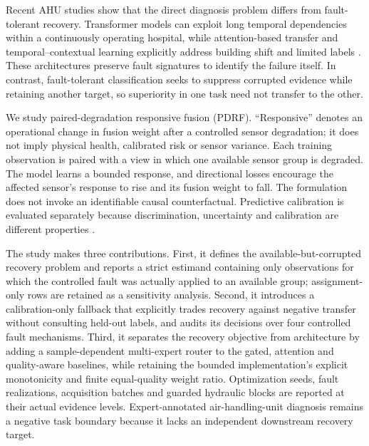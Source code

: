 \documentclass[11pt]{article}
\begin{document}
Recent AHU studies show that the direct diagnosis problem differs from fault-tolerant recovery. Transformer models can exploit long temporal dependencies within a continuously operating hospital, while attention-based transfer and temporal--contextual learning explicitly address building shift and limited labels \citep{wang2025ahutransformer,feng2024attention,wang2026temporal}. These architectures preserve fault signatures to identify the failure itself. In contrast, fault-tolerant classification seeks to suppress corrupted evidence while retaining another target, so superiority in one task need not transfer to the other.

We study paired-degradation responsive fusion (PDRF). ``Responsive'' denotes an operational change in fusion weight after a controlled sensor degradation; it does not imply physical health, calibrated risk or sensor variance. Each training observation is paired with a view in which one available sensor group is degraded. The model learns a bounded response, and directional losses encourage the affected sensor's response to rise and its fusion weight to fall. The formulation does not invoke an identifiable causal counterfactual. Predictive calibration is evaluated separately because discrimination, uncertainty and calibration are different properties \citep{kendall2017uncertainties,hullermeier2021uncertainty,lakshminarayanan2017ensembles,guo2017calibration,ovadia2019trust,minderer2021calibration,vaicenavicius2019calibration}.

The study makes three contributions. First, it defines the available-but-corrupted recovery problem and reports a strict estimand containing only observations for which the controlled fault was actually applied to an available group; assignment-only rows are retained as a sensitivity analysis. Second, it introduces a calibration-only fallback that explicitly trades recovery against negative transfer without consulting held-out labels, and audits its decisions over four controlled fault mechanisms. Third, it separates the recovery objective from architecture by adding a sample-dependent multi-expert router to the gated, attention and quality-aware baselines, while retaining the bounded implementation's explicit monotonicity and finite equal-quality weight ratio. Optimization seeds, fault realizations, acquisition batches and guarded hydraulic blocks are reported at their actual evidence levels. Expert-annotated air-handling-unit diagnosis remains a negative task boundary because it lacks an independent downstream recovery target.
\end{document}
